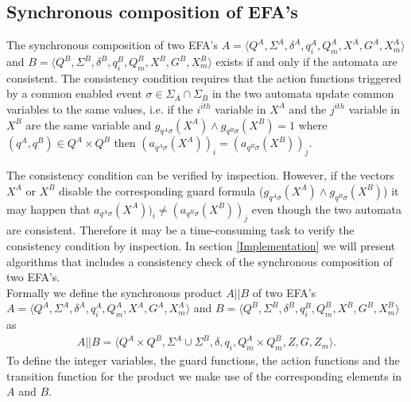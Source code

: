\documentclass{article}
\begin{document}
\subsection{Synchronous composition of EFA's}
The synchronous composition of two EFA's $A=\langle Q^A, \Sigma^A,
\delta^A, q^A_i, Q^A_m, X^{A}, G^A, X^A_m \rangle$ and $B=\langle
Q^B, \Sigma^B, \delta^B, q^B_i, Q^B_m, X^{B}, G^B, X^B_m \rangle$
exists if and only if the automata are consistent. The consistency
condition requires that the action functions triggered by a common
enabled event $\sigma\in \Sigma_{A}\cap \Sigma_{B}$ in the two
automata update common variables to the same values, i.e. if the
$i^{ith}$ variable in $X^{A}$ and the $j^{ith}$ variable in
$X^{B}$ are the same variable and $g_{q^A \sigma}(X^{A})\wedge
g_{q^B \sigma}(X^{B})=1$ where $(q^A,q^B)\in Q^A\times Q^B$ then
$(a_{q^A \sigma}(X^{A}))_i = (a_{q^B \sigma}(X^{B}))_j$.

The consistency condition can be verified by inspection. However,
if the vectors $X^{A}$ or $X^{B}$ disable the corresponding guard
formula ($g_{q^A \sigma}(X^{A})\wedge g_{q^B \sigma}(X^{B})$) it
may happen that $a_{q^A \sigma}(X^{A}))_i \neq (a_{q^B
\sigma}(X^{B}))_j$ even though the two automata are consistent.
Therefore it may be a time-consuming task to verify the
consistency condition by inspection. In section
\ref{Implementation} we will present algorithms that includes a
consistency check of the synchronous
composition of two EFA's. \\



 Formally we define the synchronous product $A||B$ of two EFA's
$A=\langle Q^A, \Sigma^A, \delta^A, q^A_i, Q^A_m, X^{A}, G^A,X^A_m
\rangle$ and $B=\langle Q^B, \Sigma^B, \delta^B, q^B_i, Q^B_m,
X^{B}, G^B,X^B_m
 \rangle$ as
\begin{eqnarray}
A||B=\langle Q^A\times Q^B, \Sigma^A \cup \Sigma^B , \delta, q_i,
Q^A_m\times Q^B_m, Z, G, Z_m \rangle.
\end{eqnarray}
To define the integer variables, the guard functions, the action
functions and the transition function for the product we make use
of the corresponding elements in $A$ and $B$.
\end{document}
